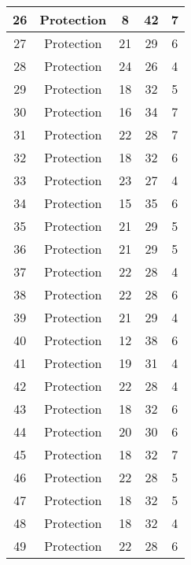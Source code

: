 \documentclass[results.tex]{subfiles}
\begin{document}
\begin{center}
\begin{tabular}{| c || c | c | c | c |}
    \hline
    26 & Protection & 8 & 42 & 7 \\ 
    \hline
    27 & Protection & 21 & 29 & 6 \\ 
    \hline
    28 & Protection & 24 & 26 & 4 \\ 
    \hline
    29 & Protection & 18 & 32 & 5 \\ 
    \hline
    30 & Protection & 16 & 34 & 7 \\ 
    \hline
    31 & Protection & 22 & 28 & 7 \\ 
    \hline
    32 & Protection & 18 & 32 & 6 \\ 
    \hline
    33 & Protection & 23 & 27 & 4 \\ 
    \hline
    34 & Protection & 15 & 35 & 6 \\ 
    \hline
    35 & Protection & 21 & 29 & 5 \\ 
    \hline
    36 & Protection & 21 & 29 & 5 \\ 
    \hline
    37 & Protection & 22 & 28 & 4 \\ 
    \hline
    38 & Protection & 22 & 28 & 6 \\ 
    \hline
    39 & Protection & 21 & 29 & 4 \\ 
    \hline
    40 & Protection & 12 & 38 & 6 \\ 
    \hline
    41 & Protection & 19 & 31 & 4 \\ 
    \hline
    42 & Protection & 22 & 28 & 4 \\ 
    \hline
    43 & Protection & 18 & 32 & 6 \\ 
    \hline
    44 & Protection & 20 & 30 & 6 \\ 
    \hline
    45 & Protection & 18 & 32 & 7 \\ 
    \hline
    46 & Protection & 22 & 28 & 5 \\ 
    \hline
    47 & Protection & 18 & 32 & 5 \\ 
    \hline
    48 & Protection & 18 & 32 & 4 \\ 
    \hline
    49 & Protection & 22 & 28 & 6 \\ 
    \hline   \end{tabular}
\end{center}
\end{document}
